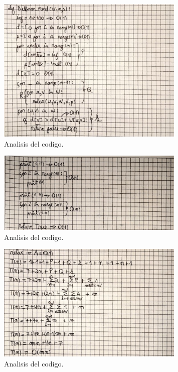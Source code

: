 \begin{figure}[H]
	\centering
	\includegraphics[width=0.8\textwidth]{complejidad_distancia_ejem2_2.png}
	\caption{Analisis del codigo.}
	\label{fig:complejidad1}
\end{figure}
\begin{figure}[H]
	\centering
	\includegraphics[width=0.8\textwidth]{complejidad_distancia_ejem2_3.png}
	\caption{Analisis del codigo.}
	\label{fig:complejidad1}
\end{figure}
\begin{figure}[H]
	\centering
	\includegraphics[width=0.8\textwidth]{complejidad_distancia_ejem2_4.png}
	\caption{Analisis del codigo.}
	\label{fig:complejidad1}
\end{figure}
